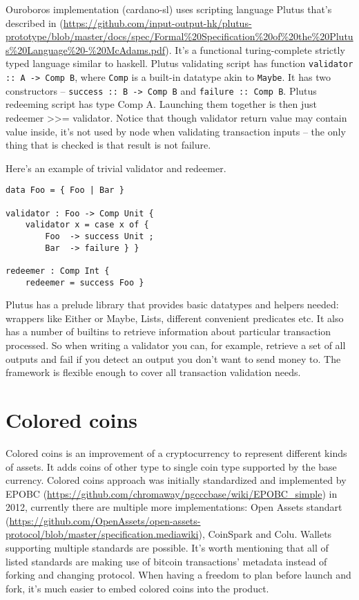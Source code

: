 \documentclass[]{itmo-student-thesis}
\begin{document}
Ouroboros implementation (cardano-sl) uses scripting language Plutus
that’s described in
(\url{https://github.com/input-output-hk/plutus-prototype/blob/master/docs/spec/Formal\%20Specification\%20of\%20the\%20Plutus\%20Language\%20-\%20McAdams.pdf}). It’s
a functional turing-complete strictly typed language similar to
haskell. Plutus validating script has function \lstinline|validator :: A -> Comp B|,
where \lstinline|Comp| is a built-in datatype akin to
\lstinline|Maybe|. It has two constructors -- \lstinline|success :: B -> Comp B|
and \lstinline|failure :: Comp B|. Plutus redeeming script
has type Comp A. Launching them together is then just redeemer >>=
validator. Notice that though validator return value may contain value
inside, it’s not used by node when validating transaction inputs --
the only thing that is checked is that result is not failure.

Here’s an example of trivial validator and redeemer.

\begin{lstlisting}[float=!h,caption={Пример исходного кода на Java}]
data Foo = { Foo | Bar }

validator : Foo -> Comp Unit {
    validator x = case x of {
        Foo  -> success Unit ;
        Bar  -> failure } }

redeemer : Comp Int {
    redeemer = success Foo }
\end{lstlisting}

Plutus has a prelude library that provides basic datatypes and helpers
needed: wrappers like Either or Maybe, Lists, different convenient
predicates etc. It also has a number of builtins to retrieve
information about particular transaction processed. So when writing a
validator you can, for example, retrieve a set of all outputs and fail
if you detect an output you don’t want to send money to. The framework
is flexible enough to cover all transaction validation needs.

\section{Colored coins}

Colored coins is an improvement of a cryptocurrency to represent
different kinds of assets. It adds coins of other type to single coin
type supported by the base currency. Colored coins approach was
initially standardized and implemented by EPOBC
(\url{https://github.com/chromaway/ngcccbase/wiki/EPOBC_simple}) in
2012, currently there are multiple more implementations: Open Assets
standart
(\url{https://github.com/OpenAssets/open-assets-protocol/blob/master/specification.mediawiki}),
CoinSpark and Colu. Wallets supporting multiple standards are
possible. It’s worth mentioning that all of listed standards are
making use of bitcoin transactions’ metadata instead of forking and
changing protocol. When having a freedom to plan before launch and
fork, it’s much easier to embed colored coins into the product.
\end{document}
